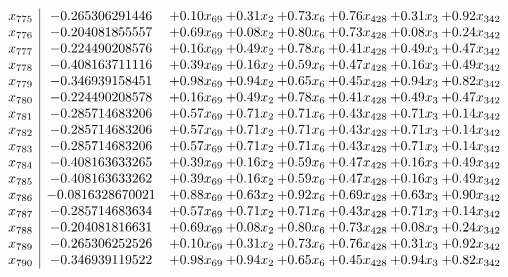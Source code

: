 \documentclass[8pt]{article}
\begin{document}
\[\begin{array}{c| c c@{\hskip 2pt} c@{\hskip 2pt} c@{\hskip 2pt} c@{\hskip 2pt} c@{\hskip 2pt} c@{\hskip 2pt} }
 x_{775}   &  -0.265306291446 & +  0.10 x_{69} & +  0.31 x_{2} & +  0.73 x_{6} & +  0.76 x_{428} & +  0.31 x_{3} & +  0.92 x_{342}\\
 x_{776}   &  -0.204081855557 & +  0.69 x_{69} & +  0.08 x_{2} & +  0.80 x_{6} & +  0.73 x_{428} & +  0.08 x_{3} & +  0.24 x_{342}\\
 x_{777}   &  -0.224490208576 & +  0.16 x_{69} & +  0.49 x_{2} & +  0.78 x_{6} & +  0.41 x_{428} & +  0.49 x_{3} & +  0.47 x_{342}\\
 x_{778}   &  -0.408163711116 & +  0.39 x_{69} & +  0.16 x_{2} & +  0.59 x_{6} & +  0.47 x_{428} & +  0.16 x_{3} & +  0.49 x_{342}\\
 x_{779}   &  -0.346939158451 & +  0.98 x_{69} & +  0.94 x_{2} & +  0.65 x_{6} & +  0.45 x_{428} & +  0.94 x_{3} & +  0.82 x_{342}\\
 x_{780}   &  -0.224490208578 & +  0.16 x_{69} & +  0.49 x_{2} & +  0.78 x_{6} & +  0.41 x_{428} & +  0.49 x_{3} & +  0.47 x_{342}\\
 x_{781}   &  -0.285714683206 & +  0.57 x_{69} & +  0.71 x_{2} & +  0.71 x_{6} & +  0.43 x_{428} & +  0.71 x_{3} & +  0.14 x_{342}\\
 x_{782}   &  -0.285714683206 & +  0.57 x_{69} & +  0.71 x_{2} & +  0.71 x_{6} & +  0.43 x_{428} & +  0.71 x_{3} & +  0.14 x_{342}\\
 x_{783}   &  -0.285714683206 & +  0.57 x_{69} & +  0.71 x_{2} & +  0.71 x_{6} & +  0.43 x_{428} & +  0.71 x_{3} & +  0.14 x_{342}\\
 x_{784}   &  -0.408163633265 & +  0.39 x_{69} & +  0.16 x_{2} & +  0.59 x_{6} & +  0.47 x_{428} & +  0.16 x_{3} & +  0.49 x_{342}\\
 x_{785}   &  -0.408163633262 & +  0.39 x_{69} & +  0.16 x_{2} & +  0.59 x_{6} & +  0.47 x_{428} & +  0.16 x_{3} & +  0.49 x_{342}\\
 x_{786}   &  -0.0816328670021 & +  0.88 x_{69} & +  0.63 x_{2} & +  0.92 x_{6} & +  0.69 x_{428} & +  0.63 x_{3} & +  0.90 x_{342}\\
 x_{787}   &  -0.285714683634 & +  0.57 x_{69} & +  0.71 x_{2} & +  0.71 x_{6} & +  0.43 x_{428} & +  0.71 x_{3} & +  0.14 x_{342}\\
 x_{788}   &  -0.204081816631 & +  0.69 x_{69} & +  0.08 x_{2} & +  0.80 x_{6} & +  0.73 x_{428} & +  0.08 x_{3} & +  0.24 x_{342}\\
 x_{789}   &  -0.265306252526 & +  0.10 x_{69} & +  0.31 x_{2} & +  0.73 x_{6} & +  0.76 x_{428} & +  0.31 x_{3} & +  0.92 x_{342}\\
 x_{790}   &  -0.346939119522 & +  0.98 x_{69} & +  0.94 x_{2} & +  0.65 x_{6} & +  0.45 x_{428} & +  0.94 x_{3} & +  0.82 x_{342}\\

\end{array}\]
\end{document}

